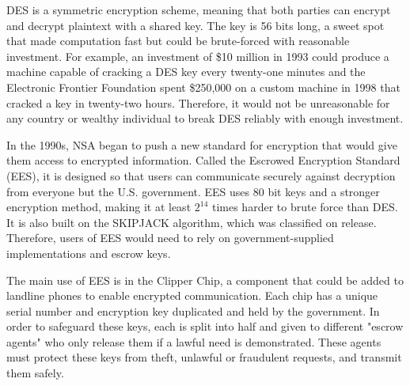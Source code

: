 \documentclass[12pt]{turabian-researchpaper}
\begin{document}
DES is a symmetric encryption scheme, meaning that both parties can encrypt and decrypt plaintext with a shared key.
The key is 56 bits long, a sweet spot that made computation fast but could be brute-forced with reasonable investment.
For example, an investment of \$10 million in 1993 could produce a machine capable of cracking a DES key every twenty-one minutes
  and the Electronic Frontier Foundation spent \$250,000 on a custom machine in 1998 that cracked a key in twenty-two hours.
Therefore, it would not be unreasonable for any country or wealthy individual to break DES reliably with enough investment.

In the 1990s, NSA began to push a new standard for encryption that would give them access to encrypted information.
Called the Escrowed Encryption Standard (EES), it is designed so that users can communicate securely against decryption from everyone but the U.S. government.
EES uses 80 bit keys and a stronger encryption method, making it at least $2^{14}$ times harder to brute force than DES.
It is also built on the SKIPJACK algorithm, which was classified on release. Therefore, users of EES would need to rely on government-supplied implementations and escrow keys.

The main use of EES is in the Clipper Chip, a component that could be added to landline phones to enable encrypted communication.
Each chip has a unique serial number and encryption key duplicated and held by the government.
In order to safeguard these keys, each is split into half and given to different "escrow agents" who only release them if a lawful need is demonstrated.
These agents must protect these keys from theft, unlawful or fraudulent requests, and transmit them safely.
\end{document}
